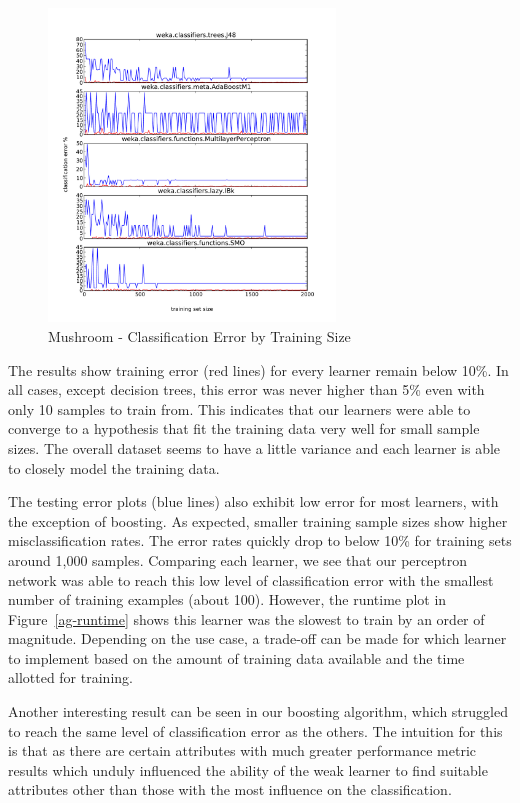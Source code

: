 \documentclass{sig-alternate}
\begin{document}
\begin{figure}[!htbp]
    \centering
    \includegraphics[width=3in]{data/agaricus-lepiota/learning-curve-10to2000/stacked-test-error.pdf}
    \caption{Mushroom - Classification Error by Training Size \label{ag-error}}
\end{figure} 

The results show training error (red lines) for every learner remain below 10\%. In all cases, except decision trees, this error was never higher than 5\% even with only 10 samples to train from. This indicates that our learners were able to converge to a hypothesis that fit the training data very well for small sample sizes. The overall dataset seems to have a little variance and each learner is able to closely model the training data.

The testing error plots (blue lines) also exhibit low error for most learners, with the exception of boosting. As expected, smaller training sample sizes show higher misclassification rates. The error rates quickly drop to below 10\% for training sets around 1,000 samples. Comparing each learner, we see that our perceptron network was able to reach this low level of classification error with the smallest number of training examples (about 100). However, the runtime plot in Figure~\ref{ag-runtime} shows this learner was the slowest to train by an order of magnitude. Depending on the use case, a trade-off can be made for which learner to implement based on the amount of training data available and the time allotted for training.

Another interesting result can be seen in our boosting algorithm, which struggled to reach the same level of classification error as the others. The intuition for this is that as there are certain attributes with much greater performance metric results which unduly influenced the ability of the weak learner to find suitable attributes other than those with the most influence on the classification.
\end{document}
